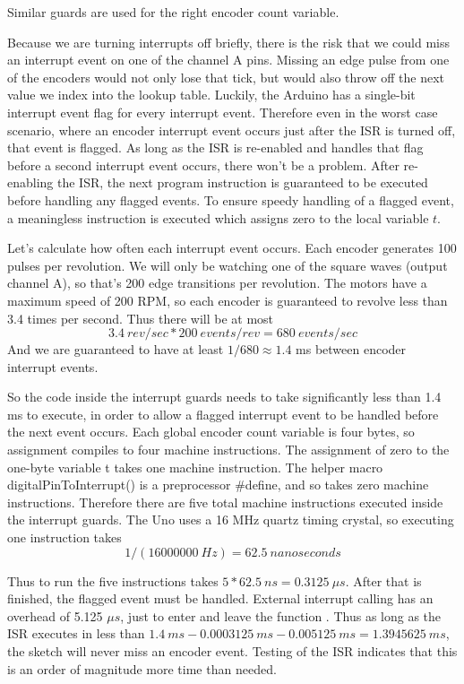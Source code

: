 Similar guards are used for the right encoder count variable. 

Because we are turning interrupts off briefly, there is the risk that we could miss an interrupt event on one of the channel A pins. Missing an edge pulse from one of the encoders would not only lose that tick, but would also throw off the next value we index into the lookup table. Luckily, the Arduino has a single-bit interrupt event flag for every interrupt event. Therefore even in the worst case scenario, where an encoder interrupt event occurs just after the ISR is turned off, that event is flagged. As long as the ISR is re-enabled and handles that flag before a second interrupt event occurs, there won't be a problem. After re-enabling the ISR, the next program instruction is guaranteed to be executed before handling any flagged events. To ensure speedy handling of a flagged event, a meaningless instruction is executed which assigns zero to the local variable \(t\).

Let's calculate how often each interrupt event occurs. Each encoder generates 100 pulses per revolution. We will only be watching one of the square waves (output channel A), so that's 200 edge transitions per revolution. The motors have a maximum speed of 200 RPM, so each encoder is guaranteed to revolve less than 3.4 times per second. Thus there will be at most \[3.4\ rev/sec * 200\ events/rev = 680\ events/sec\]
And we are guaranteed to have at least \(1 / 680 \approx 1.4\) ms between encoder interrupt events.

So the code inside the interrupt guards needs to take significantly less than 1.4 ms to execute, in order to allow a flagged interrupt event to be handled before the next event occurs. Each global encoder count variable is four bytes, so assignment compiles to four machine instructions. The assignment of zero to the one-byte variable t takes one machine instruction. The helper macro digitalPinToInterrupt() is a preprocessor \#define, and so takes zero machine instructions. Therefore there are five total machine instructions executed inside the interrupt guards. The Uno uses a 16 MHz quartz timing crystal, so executing one instruction takes \[1 / (16000000\ Hz) = 62.5\ nanoseconds\]

Thus to run the five instructions takes \(5 * 62.5\ ns = 0.3125\ \mu s\). After that is finished, the flagged event must be handled. External interrupt calling has an overhead of 5.125 \(\mu s\), just to enter and leave the function \cite{gammonInterrupts}. Thus as long as the ISR executes in less than \(1.4\ ms - 0.0003125\ ms - 0.005125\ ms = 1.3945625\ ms\), the sketch will never miss an encoder event. Testing of the ISR indicates that this is an order of magnitude more time than needed.